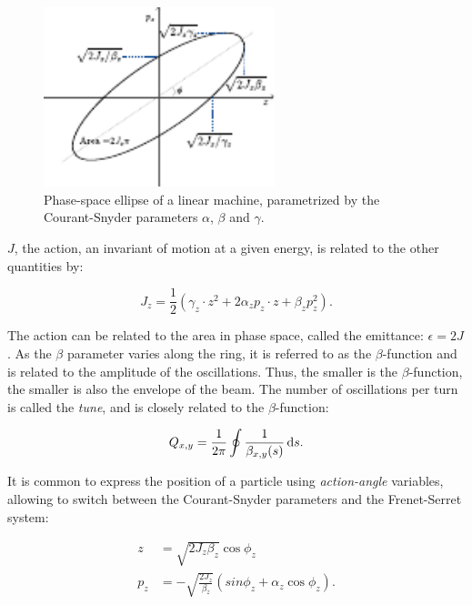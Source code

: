 \begin{figure}[htb]
    \centering
    \includegraphics[width=0.6\textwidth]{images/phase_space.pdf}
    \caption{Phase-space ellipse of a linear machine, parametrized by the Courant-Snyder
    parameters $\alpha$, $\beta$ and $\gamma$.}
    \label{fig:coordinate_systems:twiss}
\end{figure}

$J$, the action, an invariant of motion at a given energy, is related to the other quantities by:

\begin{equation}
    J_z = \frac{1}{2} (\gamma_z \cdot z^2 + 2 \alpha_z p_z \cdot z + \beta_z p_z^2).
    \label{eq:coordinate_systems:action}
\end{equation}

The action can be related to the area in phase space, called the emittance: $\epsilon = 2J$.
As the $\beta$ parameter varies along the ring, it is referred to as the $\beta$-function and is
related to the amplitude of the oscillations. Thus, the smaller is the $\beta$-function, the
smaller is also the envelope of the beam.
The number of oscillations per turn is called the \textit{tune}, and is closely related to the
$\beta$-function:

\begin{equation}
    Q_{x,y} = \frac{1}{2 \pi} \oint \frac{1}{\beta_{x,y}(s)} \mathop{}\!\mathrm{d} s.
    \label{eq:coordinate_systems:tune}
\end{equation}


It is common to express the position of a particle using \textit{action-angle} variables, allowing
to switch between the Courant-Snyder parameters and the Frenet-Serret system:

\begin{equation}
    \begin{aligned}
    z   &= \sqrt{2J_z \beta_z} \cos{\phi_z} \\
    p_z &= - \sqrt{\frac{2J_z}{\beta_z}} \left( sin{\phi_z} + \alpha_z \cos{\phi_z}\right).
    \end{aligned}
    \label{eq:coordinate_systems:action_angle}
\end{equation}


